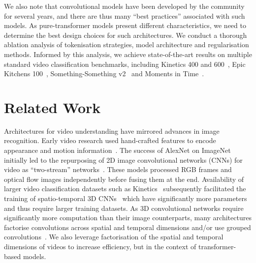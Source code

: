 \documentclass[10pt,twocolumn,letterpaper]{article}
\begin{document}
We also note that convolutional models have been developed by the community for several years, and there are thus many ``best practices'' associated with such models.
As pure-transformer models present different characteristics, we need to determine the best design choices for such architectures. 
We conduct a thorough ablation analysis of tokenisation strategies, model architecture and regularisation methods.
Informed by this analysis, we achieve state-of-the-art results on multiple standard video classification benchmarks, including Kinetics 400 and 600~\cite{kay_arxiv_2017}, Epic Kitchens 100~\cite{damen_arxiv_2020}, Something-Something v2~\cite{goyal_iccv_2017} and Moments in Time~\cite{monfort_pami_2019}.



 \section{Related Work}

Architectures for video understanding have mirrored advances in image recognition.
Early video research used hand-crafted features to encode appearance and motion information~\cite{laptev_ijcv_2005, wang_ijcv_2013}.
The success of AlexNet on ImageNet~\cite{krizhevsky_neurips_2012, deng_cvpr_2009} initially led to the repurposing of 2D image convolutional networks (CNNs) for video as ``two-stream'' networks~\cite{karpathy_cvpr_2014, simonyan_neurips_2014, ng_cvpr_2015}.
These models processed RGB frames and optical flow images independently before fusing them at the end.
Availability of larger video classification datasets such as Kinetics~\cite{kay_arxiv_2017} subsequently facilitated the training of spatio-temporal 3D CNNs~\cite{carreira_cvpr_2017, feichtenhofer_neurips_2016,tran_iccv_2015} which have significantly more parameters and thus require larger training datasets.
As 3D convolutional networks require significantly more computation than their image counterparts, many architectures factorise convolutions across spatial and temporal dimensions and/or use grouped convolutions~\cite{sun_iccv_2015,tran_iccv_2019,tran_cvpr_2018,xie_s3d_eccv_2018, feichtenhofer_cvpr_2020}.
We also leverage factorisation of the spatial and temporal dimensions of videos to increase efficiency, but in the context of transformer-based models.
\end{document}
